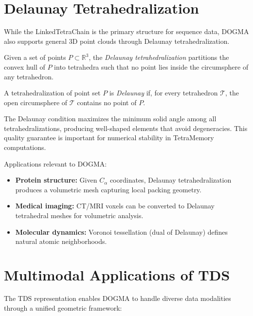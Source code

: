 \section{Delaunay Tetrahedralization}
\label{sec:delaunay}

While the LinkedTetraChain is the primary structure for sequence data, DOGMA
also supports general 3D point clouds through Delaunay tetrahedralization.

Given a set of points $P \subset \mathbb{R}^3$, the \emph{Delaunay
tetrahedralization} partitions the convex hull of $P$ into tetrahedra such that
no point lies inside the circumsphere of any tetrahedron.

\begin{definition}
A tetrahedralization of point set $P$ is \emph{Delaunay} if, for every
tetrahedron $\mathcal{T}$, the open circumsphere of $\mathcal{T}$ contains no
point of $P$.
\end{definition}

The Delaunay condition maximizes the minimum solid angle among all
tetrahedralizations, producing well-shaped elements that avoid degeneracies.
This quality guarantee is important for numerical stability in TetraMemory
computations.

Applications relevant to DOGMA:
\begin{itemize}[leftmargin=1.8em]
  \item \textbf{Protein structure:} Given $C_\alpha$ coordinates, Delaunay
        tetrahedralization produces a volumetric mesh capturing local packing
        geometry.
  \item \textbf{Medical imaging:} CT/MRI voxels can be converted to Delaunay
        tetrahedral meshes for volumetric analysis.
  \item \textbf{Molecular dynamics:} Voronoi tessellation (dual of Delaunay)
        defines natural atomic neighborhoods.
\end{itemize}

\section{Multimodal Applications of TDS}
\label{sec:tds-multimodal}

The TDS representation enables DOGMA to handle diverse data modalities through
a unified geometric framework:

